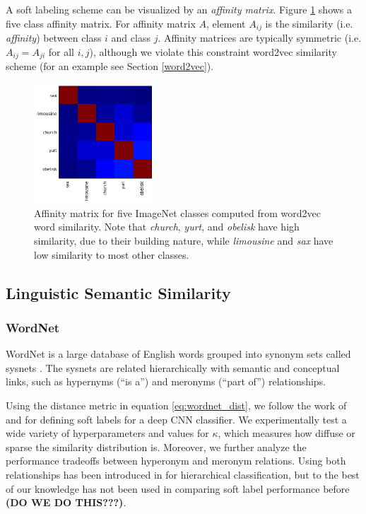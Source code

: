 A soft labeling scheme can be visualized by an \emph{affinity matrix}. Figure
\ref{fig:aff-5_1} shows a five class affinity matrix. For affinity matrix $A$,
element $A_{ij}$ is the similarity (i.e. \emph{affinity}) between class $i$ and
class $j$. Affinity matrices are typically symmetric (i.e. $A_{ij} = A_{ji}$ for
all $i, j$), although we violate this constraint word2vec similarity scheme (for
an example see Section \ref{word2vec}).

\begin{figure}[!tb]
  \centering
  \includegraphics[width=0.4\textwidth]{figs/aff-5_1.png}
  \caption{
      Affinity matrix for five ImageNet classes computed from word2vec word
      similarity. Note that \emph{church}, \emph{yurt}, and
      \emph{obelisk} have high similarity, due to their building nature, while
      \emph{limousine} and \emph{sax} have low similarity to most other classes.
  }
  \label{fig:aff-5_1}
\end{figure}

\subsection{Linguistic Semantic Similarity}


\subsubsection{WordNet}

WordNet is a large database of English words grouped into synonym sets called
sysnets \cite{miller1995wordnet}.
The sysnets are related hierarchically with semantic and conceptual links, such
as hypernyms (``is a'') and meronyms (``part of'') relationships.

Using the distance metric in equation \ref{eq:wordnet_dist}, we follow the work
of \cite{fergus2010semantic} and \cite{zhao2011large} for defining soft labels
for a deep CNN classifier. We experimentally test a wide variety of
hyperparameters and values for $\kappa$, which measures how diffuse or sparse
the similarity distribution is.  Moreover, we further analyze the performance
tradeoffs between hyperonym and meronym relations.  Using both relationships has
been introduced in \cite{marszalek2007semantic} for hierarchical classification,
but to the best of our knowledge has not been used in comparing soft label
performance before \textbf{(DO WE DO THIS???)}.


